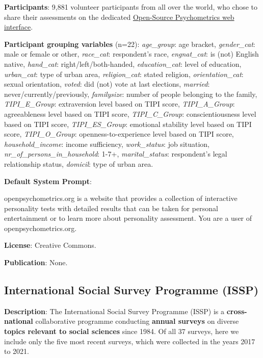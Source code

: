 \documentclass{article} %
\begin{document}
\textbf{Participants}: 9,881 volunteer participants from all over the world, who chose to share their assessments on the dedicated \href{https://openpsychometrics.org/tests/RWAS/}{Open-Source Psychometrics web interface}.

\textbf{Participant grouping variables} (n=22):
\textit{age\_group}: age bracket,
\textit{gender\_cat}: male or female or other,
\textit{race\_cat}: respondent's race,
\textit{engnat\_cat}: is (not) English native,
\textit{hand\_cat}: right/left/both-handed,
\textit{education\_cat}: level of education,
\textit{urban\_cat}: type of urban area,
\textit{religion\_cat}: stated religion,
\textit{orientation\_cat}: sexual orientation,
\textit{voted}: did (not) vote at last elections,
\textit{married}: never/currently/previously,
\textit{familysize}: number of people belonging to the family,
\textit{TIPI\_E\_Group}: extraversion level based on TIPI score,
\textit{TIPI\_A\_Group}: agreeableness level based on TIPI score,
\textit{TIPI\_C\_Group}: conscientiousness level based on TIPI score,
\textit{TIPI\_ES\_Group}: emotional stability level based on TIPI score,
\textit{TIPI\_O\_Group}: openness-to-experience level based on TIPI score,
\textit{household\_income}: income sufficiency,
\textit{work\_status}: job situation,
\textit{nr\_of\_persons\_in\_household}: 1-7+,
\textit{marital\_status}: respondent's legal relationship status,
\textit{domicil}: type of urban area.

\textbf{Default System Prompt}:

\begin{examplebox}
openpsychometrics.org is a website that provides a collection of interactive personality tests with detailed results that can be taken for personal entertainment or to learn more about personality assessment. You are a user of openpsychometrics.org.
\end{examplebox}

\textbf{License}: Creative Commons.

\textbf{Publication}: None.

\subsection{International Social Survey Programme (ISSP)}

\textbf{Description}:
The International Social Survey Programme (ISSP) is a \textbf{cross-national} collaborative programme conducting \textbf{annual surveys} on diverse \textbf{topics relevant to social sciences} since 1984.
Of all 37 surveys, here we include only the five most recent surveys, which were collected in the years 2017 to 2021.
\end{document}
